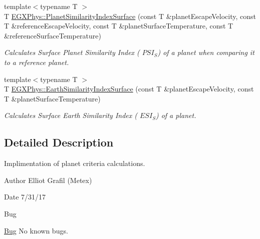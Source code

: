\begin{DoxyCompactItemize}
{\footnotesize template$<$typename T $>$ }\\T \hyperlink{group___astrophysics_gae0c7dce2779d66b0560ca388a34ddc39}{E\+G\+X\+Phys\+::\+Planet\+Similarity\+Index\+Surface} (const T \&planet\+Escape\+Velocity, const T \&reference\+Escape\+Velocity, const T \&planet\+Surface\+Temperature, const T \&reference\+Surface\+Temperature)
\begin{DoxyCompactList}\small\item\em Calculates Surface Planet Similarity Index ( $PSI_S$) of a planet when comparing it to a reference planet. \end{DoxyCompactList}\item 
{\footnotesize template$<$typename T $>$ }\\T \hyperlink{group___astrophysics_ga1df772b0ed354ca7f7e4a7a4af072325}{E\+G\+X\+Phys\+::\+Earth\+Similarity\+Index\+Surface} (const T \&planet\+Escape\+Velocity, const T \&planet\+Surface\+Temperature)
\begin{DoxyCompactList}\small\item\em Calculates Surface Earth Similarity Index ( $ESI_S$) of a planet. \end{DoxyCompactList}\end{DoxyCompactItemize}


\subsection{Detailed Description}
Implimentation of planet criteria calculations. 

\begin{DoxyAuthor}{Author}
Elliot Grafil (Metex) 
\end{DoxyAuthor}
\begin{DoxyDate}{Date}
7/31/17 
\end{DoxyDate}
\begin{DoxyRefDesc}{Bug}
\item[\hyperlink{bug__bug000018}{Bug}]No known bugs. \end{DoxyRefDesc}
